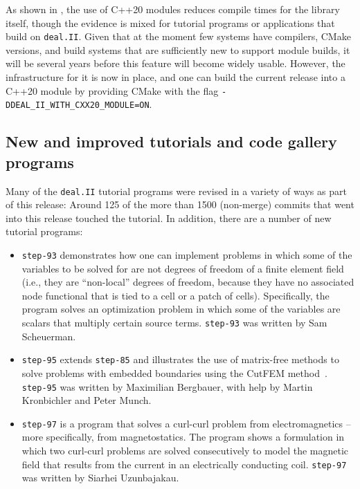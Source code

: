 \documentclass{ansarticle-preprint}
\newcommand{\specialword}[1]{\texttt{#1}}
\newcommand{\dealii}{{\specialword{deal.II}}\xspace}
\newcommand{\step}[1]{{\specialword{step-#1}}\xspace}
\begin{document}
As shown in \cite{bangerth2025experienceconvertinglargemathematical},
the use of C++20 modules
reduces compile times for the library itself, though the evidence is
mixed for tutorial programs or applications that build on
\dealii{}. Given that at the moment few systems have compilers, CMake
versions, and build systems that are sufficiently new to support
module builds, it will be several years before this feature will
become widely usable. However, the infrastructure for it is now
in place, and one can build the current release into a C++20 module by
providing CMake with the flag \texttt{-DDEAL\_II\_WITH\_CXX20\_MODULE=ON}.



\subsection{New and improved tutorials and code gallery programs}
\label{subsec:steps}

Many of the \dealii tutorial programs were revised in a variety of ways
as part of this release: Around 125 of the more than 1500 (non-merge)
commits that went into this release touched the tutorial.
In addition, there are a number of new tutorial
programs:
\begin{itemize}
  \item
    \step{93}
    demonstrates how one can implement problems in which some of the
    variables to be solved for are not degrees of freedom of a finite
    element field (i.e., they are ``non-local'' degrees of freedom, because
    they have no associated node functional that is tied to a cell or
    a patch of cells). Specifically, the program solves an
    optimization problem in which some of the variables are scalars
    that multiply certain source terms.
    \step{93} was written by Sam Scheuerman.
  \item
    \step{95} extends \step{85} and illustrates the use of matrix-free methods to solve
    problems with embedded boundaries using the CutFEM method~\cite{bergbauer2025high}. \step{95} was written
    by Maximilian Bergbauer, with help by Martin Kronbichler and Peter Munch.
  \item
    \step{97}
    is a program that solves a curl-curl problem from electromagnetics
    -- more specifically, from magnetostatics. The program shows a
    formulation in which two curl-curl problems are solved
    consecutively to model the magnetic field that results from the
    current in an electrically conducting coil.
    \step{97} was written by Siarhei Uzunbajakau.
\end{itemize}
\end{document}
